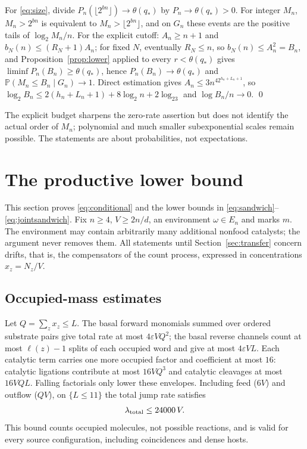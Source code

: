 \documentclass[11pt,letterpaper]{article}
\theoremstyle{plain}
\theoremstyle{definition}
\theoremstyle{remark}
\numberwithin{equation}{section}
\newcommand{\PP}{\mathbb P}
\newcommand{\eps}{\varepsilon}
\newcommand{\thetaq}{\theta(q_*)}
\begin{document}
For \eqref{eq:size}, divide $P_n(\lfloor2^{bn}\rfloor)\to\thetaq$ by $P_n\to\thetaq>0$. For integer $M_n$, $M_n>2^{bn}$ is equivalent to $M_n>\lfloor2^{bn}\rfloor$, and on $G_n$ these events are the positive tails of $\log_2M_n/n$. For the explicit cutoff: $A_n\ge n+1$ and $b_N(n)\le(R_N+1)A_n$; for fixed $N$, eventually $R_N\le n$, so $b_N(n)\le A_n^2=B_n$, and Proposition~\ref{prop:lower} applied to every $r<\thetaq$ gives $\liminf P_n(B_n)\ge\thetaq$, hence $P_n(B_n)\to\thetaq$ and $\PP(M_n\le B_n\mid G_n)\to1$. Direct estimation gives $A_n\le3n^42^{h_n+L_n+1}$, so $\log_2B_n\le2(h_n+L_n+1)+8\log_2n+2\log_23$ and $\log B_n/n\to0$. \qed

The explicit budget sharpens the zero-rate assertion but does not identify the actual order of $M_n$; polynomial and much smaller subexponential scales remain possible. The statements are about probabilities, not expectations.

\section{The productive lower bound}\label{sec:lower}

This section proves \eqref{eq:conditional} and the lower bounds in \eqref{eq:sandwich}--\eqref{eq:jointsandwich}. Fix $n\ge4$, $V\ge2n/d$, an environment $\omega\in E_n$ and marks $m$. The environment may contain arbitrarily many additional nonfood catalysts; the argument never removes them. All statements until Section~\ref{sec:transfer} concern drifts, that is, the compensators of the count process, expressed in concentrations $x_z=N_z/V$.

\subsection{Occupied-mass estimates}
Let $Q=\sum_zx_z\le L$. The basal forward monomials summed over ordered substrate pairs give total rate at most $4\eps VQ^2$; the basal reverse channels count at most $\ell(z)-1$ splits of each occupied word and give at most $4\eps VL$. Each catalytic term carries one more occupied factor and coefficient at most $16$: catalytic ligations contribute at most $16VQ^3$ and catalytic cleavages at most $16VQL$. Falling factorials only lower these envelopes. Including feed ($6V$) and outflow ($QV$), on $\{L\le11\}$ the total jump rate satisfies
\begin{equation}\label{eq:hazard}
 \lambda_{\rm total}\le24000\,V .
\end{equation}
This bound counts occupied molecules, not possible reactions, and is valid for every source configuration, including coincidences and dense hosts.
\end{document}
